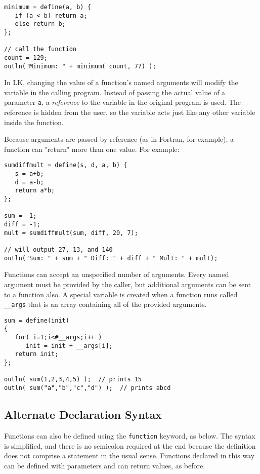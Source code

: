 \documentclass{article}
\begin{document}
\begin{verbatim}
minimum = define(a, b) {
   if (a < b) return a;
   else return b;
};

// call the function
count = 129;
outln("Minimum: " + minimum( count, 77) );
\end{verbatim}

In LK, changing the value of a function's named arguments will modify the variable in the calling program.  Instead of passing the actual value of a parameter \texttt{a}, a \emph{reference} to the variable in the original program is used.  The reference is hidden from the user, so the variable acts just like any other variable inside the function.  

Because arguments are passed by reference (as in Fortran, for example), a function can "return" more than one value.  For example:

\begin{verbatim}
sumdiffmult = define(s, d, a, b) {
   s = a+b;
   d = a-b;
   return a*b;
};

sum = -1;
diff = -1;
mult = sumdiffmult(sum, diff, 20, 7);

// will output 27, 13, and 140
outln("Sum: " + sum + " Diff: " + diff + " Mult: " + mult);
\end{verbatim}

Functions can accept an unspecified number of arguments.  Every named argument must be provided by the caller, but additional arguments can be sent to a function also.  A special variable is created when a function runs called \texttt{\_\_args} that is an array containing all of the provided arguments.

\begin{verbatim}
sum = define(init)
{
   for( i=1;i<#__args;i++ )
      init = init + __args[i];
   return init;
};

outln( sum(1,2,3,4,5) );  // prints 15
outln( sum("a","b","c","d") );  // prints abcd
\end{verbatim}


\subsection{Alternate Declaration Syntax}

Functions can also be defined using the \texttt{function} keyword, as below.  The syntax is simplified, and there is no semicolon required at the end because the definition does not comprise a statement in the usual sense.  Functions declared in this way can be defined with parameters and can return values, as before.
\end{document}
